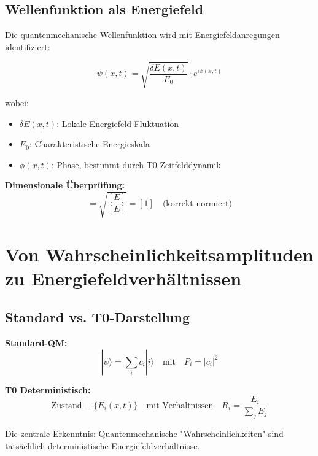 \documentclass[12pt,a4paper]{report}
\begin{document}
	\subsection{Wellenfunktion als Energiefeld}
	\label{subsec:wave_function_energy_field}
	
	Die quantenmechanische Wellenfunktion wird mit Energiefeldanregungen identifiziert:
	
	\begin{equation}
		\psi(x,t) = \sqrt{\frac{\delta E(x,t)}{E_0}} \cdot e^{i\phi(x,t)}
		\label{eq:wave_function_energy}
	\end{equation}
	
	wobei:
	\begin{itemize}
		\item $\delta E(x,t)$: Lokale Energiefeld-Fluktuation
		\item $E_0$: Charakteristische Energieskala
		\item $\phi(x,t)$: Phase, bestimmt durch T0-Zeitfelddynamik
	\end{itemize}
	
	\textbf{Dimensionale Überprüfung:}
	\begin{equation}
		[\psi] = \sqrt{\frac{[E]}{[E]}} = [1] \quad \text{(korrekt normiert)}
	\end{equation}
	
	\section{Von Wahrscheinlichkeitsamplituden zu Energiefeldverhältnissen}
	\label{sec:amplitudes_to_ratios}
	
	\subsection{Standard vs. T0-Darstellung}
	\label{subsec:standard_vs_t0}
	
	\textbf{Standard-QM:}
	\begin{equation}
		|\psi\rangle = \sum_i c_i |i\rangle \quad \text{mit} \quad P_i = |c_i|^2
	\end{equation}
	
	\textbf{T0 Deterministisch:}
	\begin{equation}
		\text{Zustand} \equiv \{E_i(x,t)\} \quad \text{mit Verhältnissen} \quad R_i = \frac{E_i}{\sum_j E_j}
	\end{equation}
	
	Die zentrale Erkenntnis: Quantenmechanische "Wahrscheinlichkeiten" sind tatsächlich deterministische Energiefeldverhältnisse.
	
\end{document}
